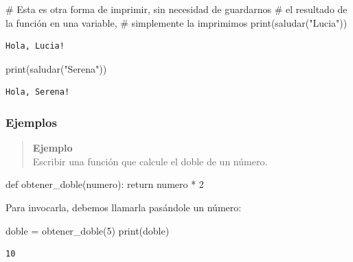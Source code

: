 \documentclass[
  letterpaper,
  DIV=11,
  numbers=noendperiod]{scrreprt}
\newenvironment{Shaded}{\begin{snugshade}}{\end{snugshade}}
\newcommand{\BuiltInTok}[1]{\textcolor[rgb]{0.00,0.23,0.31}{#1}}
\newcommand{\CommentTok}[1]{\textcolor[rgb]{0.37,0.37,0.37}{#1}}
\newcommand{\ControlFlowTok}[1]{\textcolor[rgb]{0.00,0.23,0.31}{#1}}
\newcommand{\DecValTok}[1]{\textcolor[rgb]{0.68,0.00,0.00}{#1}}
\newcommand{\KeywordTok}[1]{\textcolor[rgb]{0.00,0.23,0.31}{#1}}
\newcommand{\NormalTok}[1]{\textcolor[rgb]{0.00,0.23,0.31}{#1}}
\newcommand{\OperatorTok}[1]{\textcolor[rgb]{0.37,0.37,0.37}{#1}}
\newcommand{\StringTok}[1]{\textcolor[rgb]{0.13,0.47,0.30}{#1}}
\begin{document}
\begin{Shaded}
\begin{Highlighting}[]
\CommentTok{\# Esta es otra forma de imprimir, sin necesidad de guardarnos}
\CommentTok{\# el resultado de la función en una variable,}
\CommentTok{\# simplemente la imprimimos}
\BuiltInTok{print}\NormalTok{(saludar(}\StringTok{"Lucia"}\NormalTok{))}
\end{Highlighting}
\end{Shaded}

\begin{verbatim}
Hola, Lucia!
\end{verbatim}

\begin{Shaded}
\begin{Highlighting}[]
\BuiltInTok{print}\NormalTok{(saludar(}\StringTok{"Serena"}\NormalTok{))}
\end{Highlighting}
\end{Shaded}

\begin{verbatim}
Hola, Serena!
\end{verbatim}

\subsubsection{Ejemplos}\label{ejemplos}

\begin{quote}
\textbf{Ejemplo}\\
Escribir una función que calcule el doble de un número.
\end{quote}

\begin{Shaded}
\begin{Highlighting}[]
\KeywordTok{def}\NormalTok{ obtener\_doble(numero):}
  \ControlFlowTok{return}\NormalTok{ numero }\OperatorTok{*} \DecValTok{2}
\end{Highlighting}
\end{Shaded}

Para invocarla, debemos llamarla pasándole un número:

\begin{Shaded}
\begin{Highlighting}[]
\NormalTok{doble }\OperatorTok{=}\NormalTok{ obtener\_doble(}\DecValTok{5}\NormalTok{)}
\BuiltInTok{print}\NormalTok{(doble)}
\end{Highlighting}
\end{Shaded}

\begin{verbatim}
10
\end{verbatim}
\end{document}
